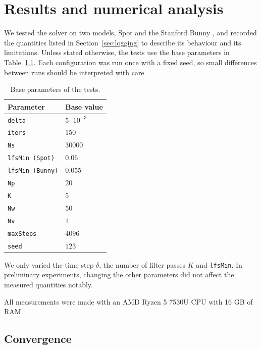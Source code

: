 \documentclass[
]{elteiktdk}[2024/04/26]
\begin{document}
	
	\chapter{Results and numerical analysis}
	\label{ch:results}
	
	We tested the solver on two models, Spot \cite{crane2013robust} and the Stanford Bunny \cite{tuealga_meshes}, and recorded the quantities listed in Section~\ref{sec:logging} to describe its behaviour and its limitations. Unless stated otherwise, the tests use the base parameters in Table~\ref{tab:params_of_base}. Each configuration was run once with a fixed seed, so small differences between runs should be interpreted with care.
	
	\begin{table}[ht]
		\centering
		\begin{tabular}{l l }
			\hline
			Parameter & Base value \\
			\hline
			\texttt{delta} & $5 \cdot 10^{-3}$\\
			\texttt{iters} & $150$\\
			\texttt{Ns} & $30000$  \\
			\texttt{lfsMin (Spot)} & $0.06$  \\
			\texttt{lfsMin (Bunny)} & $0.055$  \\
			\texttt{Np} & $20$ \\
			\texttt{K} & $5$ \\
			\texttt{Nw} & $50$  \\
			\texttt{Nv} & $1$ \\
			\texttt{maxSteps} & $4096$ \\
			\texttt{seed} & $123$ \\
			\hline
		\end{tabular}
		\caption{Base parameters of the tests.}
		\label{tab:params_of_base}
	\end{table}
	
	\begin{remark}
		We only varied the time step $\delta$, the number of filter passes $K$ and \texttt{lfsMin}. In preliminary experiments, changing the other parameters did not affect the measured quantities notably.
	\end{remark}
	All measurements were made with an AMD Ryzen 5 7530U CPU with 16 GB of RAM.
	
	\section{Convergence}
	\label{convergance}
	
\end{document}
